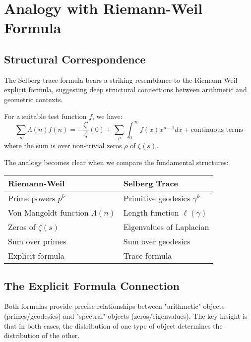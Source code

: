 \section{Analogy with Riemann-Weil Formula}
\label{sec:riemann_weil_analogy}

\subsection{Structural Correspondence}

The Selberg trace formula bears a striking resemblance to the Riemann-Weil explicit formula, suggesting deep structural connections between arithmetic and geometric contexts.

\begin{theorem}
\label{thm:riemann_weil}
For a suitable test function $f$, we have:
$$\sum_{n} \Lambda(n) f(n) = -\frac{\zeta'}{\zeta}(0) + \sum_{\rho} \int_0^{\infty} f(x) x^{\rho-1} dx + \text{continuous terms}$$
where the sum is over non-trivial zeros $\rho$ of $\zeta(s)$.
\end{theorem}

The analogy becomes clear when we compare the fundamental structures:

\begin{center}
\begin{tabular}{|l|l|}
\hline
\textbf{Riemann-Weil} & \textbf{Selberg Trace} \\
\hline
Prime powers $p^k$ & Primitive geodesics $\gamma^k$ \\
Von Mangoldt function $\Lambda(n)$ & Length function $\ell(\gamma)$ \\
Zeros of $\zeta(s)$ & Eigenvalues of Laplacian \\
Sum over primes & Sum over geodesics \\
Explicit formula & Trace formula \\
\hline
\end{tabular}
\end{center}

\subsection{The Explicit Formula Connection}

Both formulas provide precise relationships between "arithmetic" objects (primes/geodesics) and "spectral" objects (zeros/eigenvalues). The key insight is that in both cases, the distribution of one type of object determines the distribution of the other.

